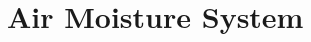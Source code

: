 \documentclass[../main]{subfiles}
\begin{document}
\chapter{Air Moisture System} \label{chp:humeSubsystem}




\end{document}
